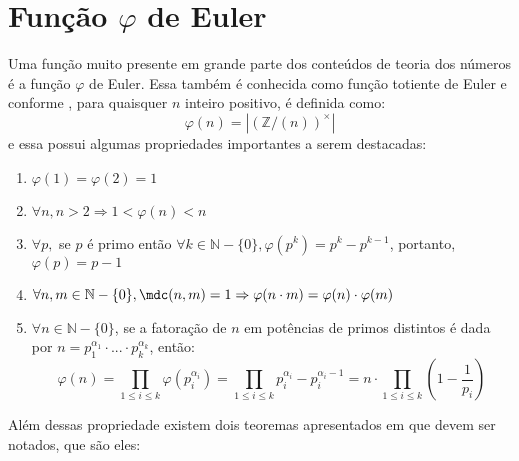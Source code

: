 
\section{Função $\varphi$ de Euler}

Uma função muito presente em grande parte dos conteúdos de teoria dos números é a função $\varphi$ de Euler. Essa também é conhecida como função totiente de Euler e conforme \cite{book:2399854}, para quaisquer $n$ inteiro positivo, é definida como:
    \begin{equation} \label{def:phi}
        \varphi(n) = |(\mathbb{Z}/(n))^{\times}|
    \end{equation}
e essa possui algumas propriedades importantes a serem destacadas:
    \begin{enumerate}
    \item $\varphi(1) = \varphi(2) = 1$
    \item \label{item:prop-phi-2} $\forall n, n > 2 \Rightarrow 1 < \varphi(n) < n$
    \item \label{item:prop-phi-3} $\forall p,$ se $p$ é primo então $\forall k \in \mathbb{N} - \{0\}, \varphi(p^k) = p^k - p^{k-1}$, portanto, $\varphi(p) = p - 1$
    \item \label{item:prop-phi-4} $\forall n, m \in \mathbb{N} - \{0\}, \mdc(n, m) = 1 \Rightarrow \varphi(n \cdot m) = \varphi(n) \cdot \varphi(m) $
    \item \label{item:prop-phi-5} $\forall n \in \mathbb{N} - \{0\}$, se a fatoração de $n$ em potências de primos distintos é dada por $n = p_{1}^{\alpha_{1}} \cdot ... \cdot p_{k}^{\alpha_{k}}$, então:
        \begin{equation} \label{lema:phi-formula}
            \varphi(n) = \prod_{1 \leq i \leq k} \varphi(p_{i}^{\alpha_{i}}) = \prod_{1 \leq i \leq k} p_{i}^{\alpha_{i}} - p_{i}^{\alpha_{i} - 1} = n \cdot \prod_{1 \leq i \leq k} \left( 1 - \frac{1}{p_{i}} \right)
        \end{equation}
    \end{enumerate}

Além dessas propriedade existem dois teoremas apresentados em \cite{book:2399854} que devem ser notados, que são eles:

